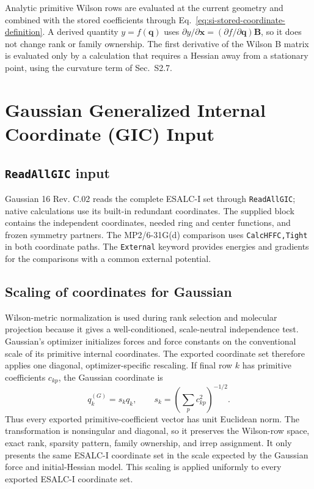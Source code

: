 \documentclass[10pt]{article}
\newcommand{\Bmat}{\mathbf{B}}
\begin{document}
{Analytic primitive Wilson rows are evaluated at the current
geometry and combined with the stored coefficients through
Eq.~\ref{eq:si-stored-coordinate-definition}. A derived quantity
\(y=f(\mathbf q)\) uses
\(\partial y/\partial\mathbf x=(\partial f/\partial\mathbf q)\Bmat\),
so it does not change rank or family ownership. The first derivative of the
Wilson B matrix is evaluated only by a calculation that requires a Hessian
away from a stationary point, using the curvature term of Sec.~S2.7.}

\section{Gaussian Generalized Internal Coordinate (GIC) Input}

\subsection{\texttt{ReadAllGIC} input}

Gaussian 16 Rev. C.02 reads the complete ESALC-I set through
\texttt{ReadAllGIC}; native calculations use its built-in redundant
coordinates. The supplied block contains the independent coordinates,
needed ring and center functions, and frozen symmetry partners. The
MP2/6-31G(d)\cite{HariharanPople1973Polarization} comparison uses \texttt{CalcHFFC,Tight} in both coordinate
paths. The \texttt{External} keyword provides energies and gradients for
the comparisons with a common external potential.

\subsection{Scaling of coordinates for Gaussian}

Wilson-metric normalization is used during rank selection and molecular
projection because it gives a well-conditioned, scale-neutral independence
test.  Gaussian's optimizer initializes forces and force constants on the
conventional scale of its primitive internal coordinates.  The exported {coordinate set}
therefore applies one diagonal, optimizer-specific rescaling.  If final row
\(k\) has primitive coefficients \(c_{kp}\), the Gaussian coordinate is
\begin{equation}
 q_k^{(G)}=s_k q_k,
 \qquad
 s_k=\left(\sum_p c_{kp}^2\right)^{-1/2}.
 \label{eq:gaussian-optimizer-scaling}
\end{equation}
Thus every exported primitive-coefficient vector has unit Euclidean norm.
The transformation is nonsingular and diagonal, so it preserves the Wilson-row
space, exact rank, sparsity pattern, family ownership, and irrep assignment.
It only presents the same ESALC-I {coordinate set} in the scale expected by the Gaussian
force and initial-Hessian model.  This scaling is applied uniformly to every exported ESALC-I coordinate set.
\end{document}
